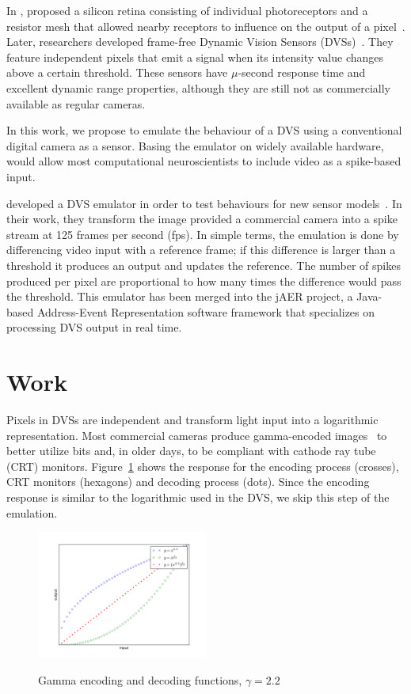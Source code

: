 \documentclass[twocolumn]{article}
\begin{document}
  In \citeyear{Mead1989}, \citeauthor{Mead1989} proposed a silicon retina consisting of individual photoreceptors and a resistor mesh that allowed nearby receptors to influence on the output of a pixel~\cite{Mead1989}. 
  Later, researchers developed frame-free Dynamic Vision Sensors (DVSs)~\cite{delbruck_dvs,bernabe_dvs}. They feature independent pixels that emit a signal when its intensity value changes above a certain threshold. These sensors have $\mu$-second response time and excellent dynamic range properties, although they are still not as commercially available as regular cameras.
  
  In this work, we propose to emulate the behaviour of a DVS using a conventional digital camera as a sensor. Basing the emulator on widely available hardware, would allow most computational neuroscientists to include video as a spike-based input.
  
  
  \citeauthor{dvs_emu} developed a DVS emulator in order to test behaviours for new sensor models~\cite{dvs_emu}. In their work, they transform the image provided a commercial camera into a spike stream at 125 frames per second (fps). In simple terms, the emulation is done by differencing video input with a reference frame; if this difference is larger than a threshold it produces an output and updates the reference. The number of spikes produced per pixel are proportional to how many times the difference would pass the threshold. This emulator has been merged into the jAER project, a Java-based Address-Event Representation software framework that specializes on processing DVS output in real time.
  
  
  \section{Work}
  
  Pixels in DVSs are independent and transform light input into a logarithmic representation. Most commercial cameras produce gamma-encoded images~\cite{Poynton_digital_video} to better utilize bits and, in older days, to be compliant with cathode ray tube (CRT) monitors. Figure~\ref{fig:gamma_coding} shows the response for the encoding process (crosses), CRT monitors (hexagons) and decoding process (dots). Since the encoding response is similar to the logarithmic used in the DVS, we skip this step of the emulation.
  
  \begin{figure}[htb]
    \includegraphics[width=0.5\textwidth]{gamma_coding}
    \label{fig:gamma_coding}
    \caption{Gamma encoding and decoding functions, $\gamma = 2.2$}
  \end{figure}
  
\end{document}
